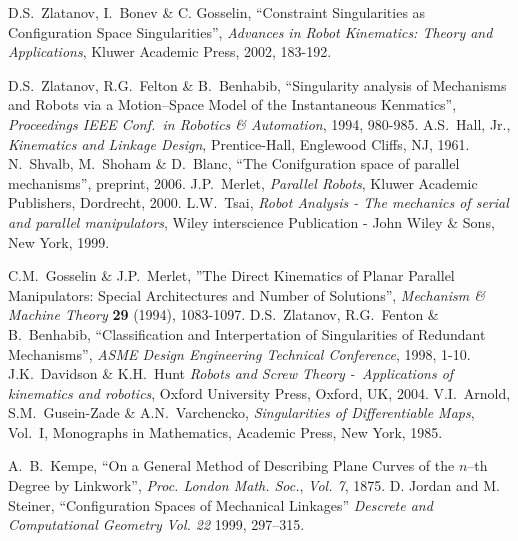 \begin{thebibliography}{9}
D.S.\ Zlatanov, I.\ Bonev \& C. Gosselin, ``Constraint
Singularities as Configuration Space Singularities'',
\textit{Advances in Robot Kinematics: Theory and Applications},
Kluwer Academic Press, 2002, 183-192.

D.S.\ Zlatanov, R.G.\ Felton \& B.\ Benhabib, ``Singularity
analysis of Mechanisms and Robots via a Motion--Space Model of the
Instantaneous Kenmatics'', \textit{Proceedings IEEE Conf.\ in
Robotics \& Automation}, 1994, 980-985.
%
A.S.~Hall, Jr., \textit{Kinematics and Linkage Design},
Prentice-Hall, Englewood Cliffs, NJ, 1961.
%
N.\ Shvalb, M.\ Shoham \& D.\ Blanc, ``The Conifguration space of
parallel mechanisms'', preprint, 2006.
%
J.P.~Merlet, \textit{Parallel Robots}, Kluwer Academic Publishers,
Dordrecht, 2000.
%
L.W.~Tsai, \textit{Robot Analysis - The mechanics of serial and
parallel manipulators}, Wiley interscience Publication - John
Wiley \& Sons, New York, 1999.

C.M.\ Gosselin \& J.P.~Merlet, ''The Direct Kinematics of Planar
Parallel Manipulators: Special Architectures and Number of
Solutions'', \textit{Mechanism \& Machine Theory} \textbf{29}
(1994), 1083-1097.
%
D.S.\ Zlatanov, R.G.\ Fenton \& B.\ Benhabib, ``Classification and
Interpertation of Singularities of Redundant Mechanisms'',
\textit{ASME Design Engineering Technical Conference}, 1998, 1-10.
%
J.K.\ Davidson \& K.H.\ Hunt \textit{Robots and Screw Theory \--\
Applications of kinematics and robotics}, Oxford University Press,
Oxford, UK, 2004.
%
V.I.\ Arnold, S.M.\ Gusein-Zade \& A.N.\ Varchencko,
\textit{Singularities of Differentiable Maps}, Vol.\ I, Monographs
in Mathematics, Academic Press, New York, 1985.

 A.\ B.\ Kempe,
``On a General Method of Describing Plane Curves of the $n$--th
Degree by Linkwork'', \textit{Proc. London Math. Soc.},
\textit{Vol. 7}, 1875.
%
 D. Jordan and M. Steiner,
``Configuration Spaces of Mechanical Linkages'' \textit{Descrete
and Computational Geometry} \textit{Vol. 22} 1999, 297--315.

\end{thebibliography}
